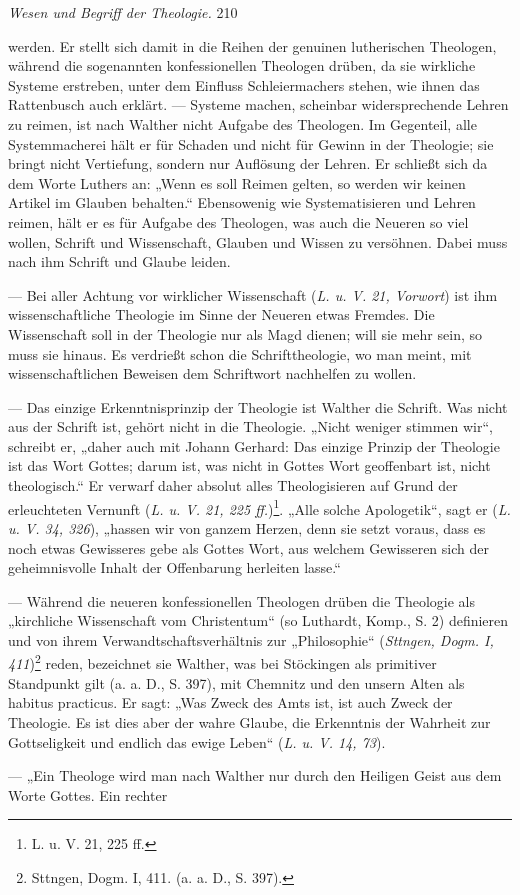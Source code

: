 \begin{center}\small{\textit{Wesen und Begriff der Theologie.}} \hfill 210\end{center}werden. Er stellt sich damit in die Reihen der genuinen lutherischen Theologen, während die sogenannten konfessionellen Theologen drüben, da sie wirkliche Systeme erstreben, unter dem Einfluss Schleiermachers stehen, wie ihnen das Rattenbusch auch erklärt. --- Systeme machen, scheinbar widersprechende Lehren zu reimen, ist nach Walther nicht Aufgabe des Theologen. Im Gegenteil, alle Systemmacherei hält er für Schaden und nicht für Gewinn in der Theologie; sie bringt nicht Vertiefung, sondern nur Auflösung der Lehren. Er schließt sich da dem Worte Luthers an: „Wenn es soll Reimen gelten, so werden wir keinen Artikel im Glauben behalten.“ Ebensowenig wie Systematisieren und Lehren reimen, hält er es für Aufgabe des Theologen, was auch die Neueren so viel wollen, Schrift und Wissenschaft, Glauben und Wissen zu versöhnen. Dabei muss nach ihm Schrift und Glaube leiden.\par --- Bei aller Achtung vor wirklicher Wissenschaft (\textit{L. u. V. 21, Vorwort}) ist ihm wissenschaftliche Theologie im Sinne der Neueren etwas Fremdes. Die Wissenschaft soll in der Theologie nur als Magd dienen; will sie mehr sein, so muss sie hinaus. Es verdrießt schon die Schrifttheologie, wo man meint, mit wissenschaftlichen Beweisen dem Schriftwort nachhelfen zu wollen.\par --- Das einzige Erkenntnisprinzip der Theologie ist Walther die Schrift. Was nicht aus der Schrift ist, gehört nicht in die Theologie. „Nicht weniger stimmen wir“, schreibt er, „daher auch mit Johann Gerhard: Das einzige Prinzip der Theologie ist das Wort Gottes; darum ist, was nicht in Gottes Wort geoffenbart ist, nicht theologisch.“ Er verwarf daher absolut alles Theologisieren auf Grund der erleuchteten Vernunft (\textit{L. u. V. 21, 225 ff.})\footnote{L. u. V. 21, 225 ff.}. „Alle solche Apologetik“, sagt er (\textit{L. u. V. 34, 326}), „hassen wir von ganzem Herzen, denn sie setzt voraus, dass es noch etwas Gewisseres gebe als Gottes Wort, aus welchem Gewisseren sich der geheimnisvolle Inhalt der Offenbarung herleiten lasse.“\par --- Während die neueren konfessionellen Theologen drüben die Theologie als „kirchliche Wissenschaft vom Christentum“ (so Luthardt, Komp., S. 2) definieren und von ihrem Verwandtschaftsverhältnis zur „Philosophie“ (\textit{Sttngen, Dogm. I, 411})\footnote{Sttngen, Dogm. I, 411. (a. a. D., S. 397).} reden, bezeichnet sie Walther, was bei Stöckingen als primitiver Standpunkt gilt (a. a. D., S. 397), mit Chemnitz und den unsern Alten als habitus practicus. Er sagt: „Was Zweck des Amts ist, ist auch Zweck der Theologie. Es ist dies aber der wahre Glaube, die Erkenntnis der Wahrheit zur Gottseligkeit und endlich das ewige Leben“ (\textit{L. u. V. 14, 73}).\par --- „Ein Theologe wird man nach Walther nur durch den Heiligen Geist aus dem Worte Gottes. Ein rechter